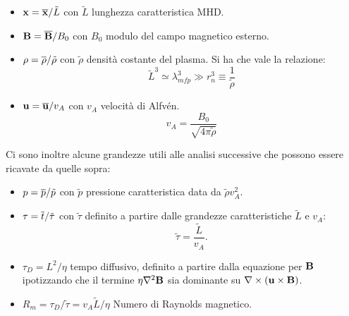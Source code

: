 \begin{itemize}
    \item $\vv{x} = \overline{\vv{x}}/\tilde{L}$ con $\tilde{L}$ lunghezza caratteristica MHD.
    \item $\vv{B} = \ov{\vv{B}}/B_0$ con $B_0$ modulo del campo magnetico esterno.
    \item $\rho = \overline{\rho}/\tilde{\rho}$ con $\tilde{\rho}$ densità costante del plasma. Si ha che vale la relazione:
          \[
              \tilde{L}^3 \simeq \lambda_{mfp}^3 \gg r_n^3 \equiv \frac{1}{\tilde{\rho }}
          \]
      \item $\vv{u} = \ov{\vv{u}}/v_A$ con $v_A$ velocità di Alfvén.
          \[v_A = \frac{B_0}{\sqrt{4\pi \tilde{\rho}}}\]
\end{itemize}
Ci sono inoltre alcune grandezze utili alle analisi successive che possono essere ricavate da quelle sopra:
\begin{itemize}
    \item $p = \overline{p}/\tilde{p}$ con $\tilde{p}$ pressione caratteristica data da $\tilde{\rho} v_A^2$.
    \item $\tau = \overline{t} /\tilde{\tau}$ con $\tilde{\tau}$ definito a partire dalle grandezze caratteristiche $\tilde{L}$ e $v_A$:
          \[\tilde{\tau} = \frac{\tilde{L}}{v_A}.\]
    \item $\tau_D = L^2 / \eta$ tempo diffusivo, definito a partire dalla equazione per $\vv{B}$ ipotizzando che il termine $\eta \nabla^2\vv{B}$ sia dominante su $\nabla \times (\vv{u} \times \vv{B})$.
    \item $R_m = \tau_D/\tilde{\tau} = v_A \tilde{L}/\eta$ Numero di Raynolds magnetico.
\end{itemize}
